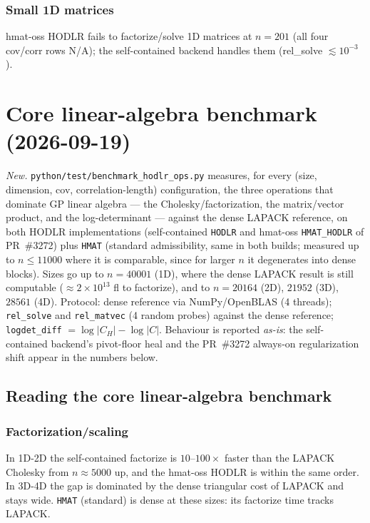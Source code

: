 \documentclass[11pt,a4paper]{article}
\begin{document}
\subsubsection*{Small 1D matrices}
\label{par:small}
hmat-oss HODLR fails to factorize/solve 1D matrices at $n{=}201$
(all four cov/corr rows N/A); the self-contained backend handles them
(rel\_solve $\lesssim 10^{-3}$).



\section{Core linear-algebra benchmark (2026-09-19)}\label{sec:ops}
\emph{New.} \texttt{python/test/benchmark\_hodlr\_ops.py} measures, for every
(size, dimension, cov, correlation-length) configuration, the three operations
that dominate GP linear algebra --- the Cholesky/factorization, the
matrix/vector product, and the log-determinant --- against the dense LAPACK
reference, on both HODLR implementations (self-contained \texttt{HODLR} and
hmat-oss \texttt{HMAT\_HODLR} of PR~\#3272) plus \texttt{HMAT} (standard
admissibility, same in both builds; measured up to $n\le 11000$ where it is
comparable, since for larger $n$ it degenerates into dense blocks).  Sizes go
up to $n=40001$ (1D), where the dense LAPACK result is still computable
($\approx 2\times10^{13}$ fl to factorize), and to $n=20164$ (2D),
$21952$ (3D), $28561$ (4D).  Protocol: dense reference via NumPy/OpenBLAS
(4 threads); \texttt{rel\_solve} and \texttt{rel\_matvec}
(4 random probes) against the dense reference; \texttt{logdet\_diff}
$=\log|C_H|-\log|C|$.  Behaviour is reported \emph{as-is}: the
self-contained backend's pivot-floor heal and the PR~\#3272 always-on
regularization shift appear in the numbers below.




\subsection{Reading the core linear-algebra benchmark}
\subsubsection*{Factorization/scaling}
In 1D-2D the self-contained factorize is $10$--$100\times$ faster than the
LAPACK Cholesky from $n\approx 5000$ up, and the hmat-oss HODLR is within the
same order.  In 3D-4D the gap is dominated by the dense triangular cost of
LAPACK and stays wide.  \texttt{HMAT} (standard) is dense at these sizes: its
factorize time tracks LAPACK.
\end{document}

